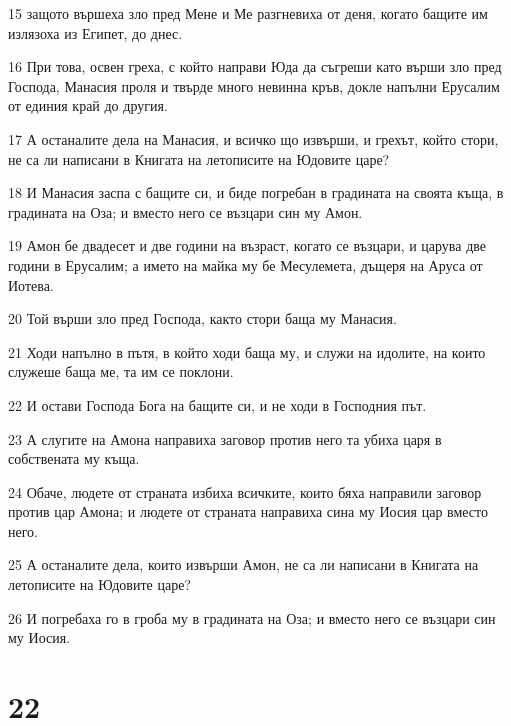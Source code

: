 \par 15 защото вършеха зло пред Мене и Ме разгневиха от деня, когато бащите им излязоха из Египет, до днес.
\par 16 При това, освен греха, с който направи Юда да съгреши като върши зло пред Господа, Манасия проля и твърде много невинна кръв, докле напълни Ерусалим от единия край до другия.
\par 17 А останалите дела на Манасия, и всичко що извърши, и грехът, който стори, не са ли написани в Книгата на летописите на Юдовите царе?
\par 18 И Манасия заспа с бащите си, и биде погребан в градината на своята къща, в градината на Оза; и вместо него се възцари син му Амон.
\par 19 Амон бе двадесет и две години на възраст, когато се възцари, и царува две години в Ерусалим; а името на майка му бе Месулемета, дъщеря на Аруса от Иотева.
\par 20 Той върши зло пред Господа, както стори баща му Манасия.
\par 21 Ходи напълно в пътя, в който ходи баща му, и служи на идолите, на които служеше баща ме, та им се поклони.
\par 22 И остави Господа Бога на бащите си, и не ходи в Господния път.
\par 23 А слугите на Амона направиха заговор против него та убиха царя в собствената му къща.
\par 24 Обаче, людете от страната избиха всичките, които бяха направили заговор против цар Амона; и людете от страната направиха сина му Иосия цар вместо него.
\par 25 А останалите дела, които извърши Амон, не са ли написани в Книгата на летописите на Юдовите царе?
\par 26 И погребаха го в гроба му в градината на Оза; и вместо него се възцари син му Иосия.

\chapter{22}


